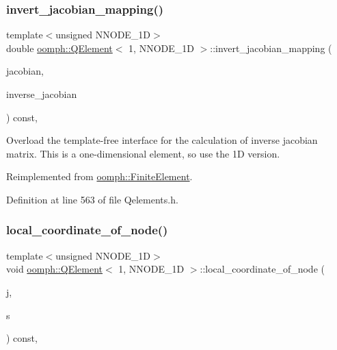 \subsubsection{\texorpdfstring{invert\+\_\+jacobian\+\_\+mapping()}{invert\_jacobian\_mapping()}}
{\footnotesize\ttfamily template$<$unsigned N\+N\+O\+D\+E\+\_\+1D$>$ \\
double \hyperlink{classoomph_1_1QElement}{oomph\+::\+Q\+Element}$<$ 1, N\+N\+O\+D\+E\+\_\+1D $>$\+::invert\+\_\+jacobian\+\_\+mapping (\begin{DoxyParamCaption}\item[{const \hyperlink{classoomph_1_1DenseMatrix}{Dense\+Matrix}$<$ double $>$ \&}]{jacobian,  }\item[{\hyperlink{classoomph_1_1DenseMatrix}{Dense\+Matrix}$<$ double $>$ \&}]{inverse\+\_\+jacobian }\end{DoxyParamCaption}) const\hspace{0.3cm}{\ttfamily [inline]}, {\ttfamily [virtual]}}



Overload the template-\/free interface for the calculation of inverse jacobian matrix. This is a one-\/dimensional element, so use the 1D version. 



Reimplemented from \hyperlink{classoomph_1_1FiniteElement_a42c86a7628fee00d3a9d35b935b29e48}{oomph\+::\+Finite\+Element}.



Definition at line 563 of file Qelements.\+h.

\mbox{\label{classoomph_1_1QElement_3_011_00_01NNODE__1D_01_4_add66ba0e7f67f51959273a56faf1c9ae}} 
\subsubsection{\texorpdfstring{local\+\_\+coordinate\+\_\+of\+\_\+node()}{local\_coordinate\_of\_node()}}
{\footnotesize\ttfamily template$<$unsigned N\+N\+O\+D\+E\+\_\+1D$>$ \\
void \hyperlink{classoomph_1_1QElement}{oomph\+::\+Q\+Element}$<$ 1, N\+N\+O\+D\+E\+\_\+1D $>$\+::local\+\_\+coordinate\+\_\+of\+\_\+node (\begin{DoxyParamCaption}\item[{const unsigned \&}]{j,  }\item[{\hyperlink{classoomph_1_1Vector}{Vector}$<$ double $>$ \&}]{s }\end{DoxyParamCaption}) const\hspace{0.3cm}{\ttfamily [inline]}, {\ttfamily [virtual]}}



